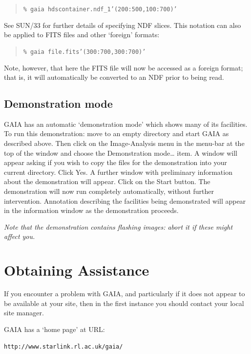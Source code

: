 \documentclass[twoside,11pt]{article}
\newcommand{\htmladdnormallink}[2]{#1}
\newcommand{\xref}[3]{#1}
\newcommand{\xlabel}[1]{}
\begin{document}
\begin{quote}
{\tt \% gaia hdscontainer.ndf\_1'(200:500,100:700)'}
\end{quote}

See \xref{SUN/33}{sun33}{}\cite{SUN33} for further details of specifying
NDF slices.  This notation can also be applied to FITS files and other
`foreign' formats:

\begin{quote}
{\tt \% gaia file.fits'(300:700,300:700)'}
\end{quote}

Note, however, that here the FITS file will now be accessed as a foreign
format; that is, it will automatically be converted to an NDF prior to
being read.

\subsection{Demonstration mode}

GAIA has an automatic `demonstration mode' which shows many of its
facilities.  To run this demonstration: move to an empty directory and
start GAIA as described above.  Then click on the {\sf Image-Analysis} menu
in the menu-bar at the top of the window and choose the {\sf Demonstration
mode\ldots} item.  A window will appear asking if you wish to copy the
files for the demonstration into your current directory.  Click {\sf
Yes}.  A further window with preliminary information about the demonstration
will appear.  Click on the {\sf Start} button.  The demonstration will now
run completely automatically, without further intervention.  Annotation
describing the facilities being demonstrated will appear in the
information window as the demonstration proceeds.

{\it Note that the demonstration contains flashing images: abort it if
these might affect you.}


\section{\xlabel{ASSIST}\label{ASSIST}Obtaining  Assistance}

If you encounter a problem with GAIA, and particularly if it does not appear
to be available at your site, then in the first instance you should contact
your local site manager.

GAIA has a `home page' at URL:

\begin{center}
\htmladdnormallink{{\tt http://www.starlink.rl.ac.uk/gaia/}}
{http://www.starlink.rl.ac.uk/gaia/}
\end{center}
\end{document}

